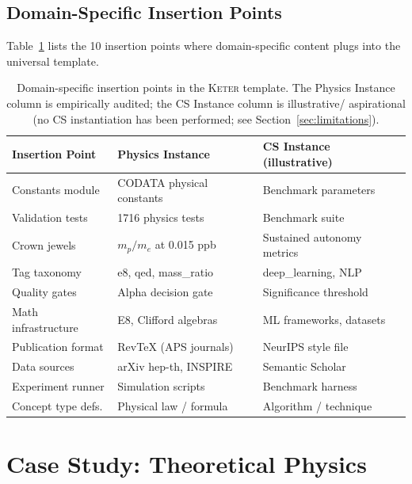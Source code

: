 \documentclass[11pt,a4paper]{article}
\newcommand{\keter}{\textsc{Keter}}
\begin{document}
\subsection{Domain-Specific Insertion Points}
\label{sec:insertion}

Table~\ref{tab:insertion} lists the 10 insertion points where domain-specific
content plugs into the universal template.

\begin{table}[t]
\centering
\caption{Domain-specific insertion points in the \keter{} template. The Physics
Instance column is empirically audited; the CS Instance column is illustrative/
aspirational (no CS instantiation has been performed; see
Section~\ref{sec:limitations}).}
\label{tab:insertion}
\small
\begin{tabular}{@{}lll@{}}
\toprule
Insertion Point & Physics Instance & CS Instance (illustrative) \\
\midrule
Constants module     & CODATA physical constants & Benchmark parameters \\
Validation tests     & 1716 physics tests        & Benchmark suite \\
Crown jewels         & $m_p/m_e$ at 0.015 ppb    & Sustained autonomy metrics \\
Tag taxonomy         & e8, qed, mass\_ratio       & deep\_learning, NLP \\
Quality gates        & Alpha decision gate        & Significance threshold \\
Math infrastructure  & E8, Clifford algebras      & ML frameworks, datasets \\
Publication format   & RevTeX (APS journals)      & NeurIPS style file \\
Data sources         & arXiv hep-th, INSPIRE      & Semantic Scholar \\
Experiment runner    & Simulation scripts         & Benchmark harness \\
Concept type defs.   & Physical law / formula     & Algorithm / technique \\
\bottomrule
\end{tabular}
\end{table}

\section{Case Study: Theoretical Physics}
\label{sec:instantiation}
\end{document}
